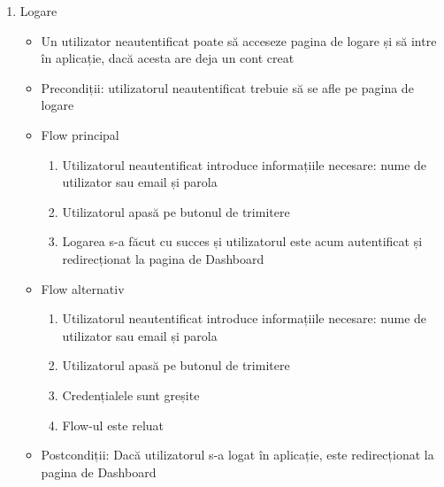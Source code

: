 \begin{enumerate}
    \item Logare
    \begin{itemize}
        \setlength\itemsep{0.5em}
        \item Un utilizator neautentificat poate să acceseze pagina de logare și să intre în aplicație, dacă acesta are deja un cont creat
        \item Precondiții: utilizatorul neautentificat trebuie să se afle pe pagina de logare
        \item Flow principal
        \begin{enumerate}
            \item Utilizatorul neautentificat introduce informațiile necesare: nume de utilizator sau email și parola
            \item Utilizatorul apasă pe butonul de trimitere
            \item Logarea s-a făcut cu succes și utilizatorul este acum autentificat și redirecționat la pagina de Dashboard
        \end{enumerate}
        \item Flow alternativ
        \begin{enumerate}
            \item Utilizatorul neautentificat introduce informațiile necesare: nume de utilizator sau email și parola
            \item Utilizatorul apasă pe butonul de trimitere
            \item Credențialele sunt greșite
            \item Flow-ul este reluat
        \end{enumerate}
        \item Postcondiții: Dacă utilizatorul s-a logat în aplicație, este redirecționat la pagina de Dashboard
    \end{itemize}
  \end{enumerate}

\newpage
